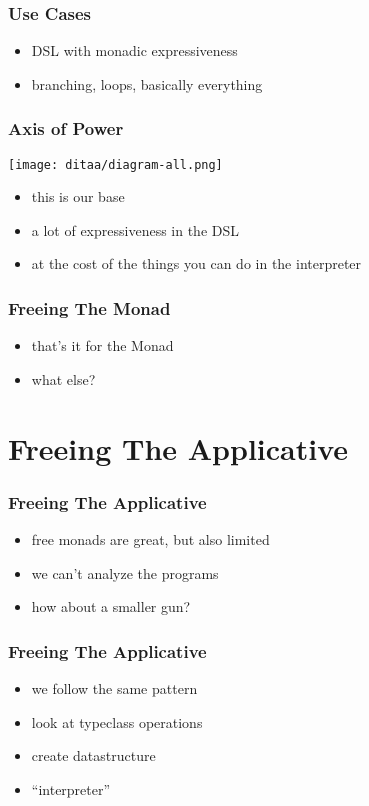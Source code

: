 \documentclass{beamer}
\begin{document}
\begin{frame}
  \frametitle{Use Cases}
  \begin{itemize}
  \item DSL with monadic expressiveness
  \item branching, loops, basically everything
  \end{itemize}
\end{frame}

\begin{frame}
  \frametitle{Axis of Power}
  \texttt{[image: ditaa/diagram-all.png]}
  \begin{itemize}
  \item this is our base
  \item a lot of expressiveness in the DSL
  \item at the cost of the things you can do in the interpreter
  \end{itemize}
\end{frame}

\begin{frame}
  \frametitle{Freeing The Monad}
  \begin{itemize}
  \item that's it for the Monad
  \item what else?
  \end{itemize}
\end{frame}

\section{Freeing The Applicative}\label{sec:free-applicative}

\begin{frame}
  \frametitle{Freeing The Applicative}
  \begin{itemize}
  \item free monads are great, but also limited
  \item we can't analyze the programs
  \item how about a smaller gun?
  \end{itemize}
\end{frame}

\begin{frame}
  \frametitle{Freeing The Applicative}
  \begin{itemize}
  \item we follow the same pattern
  \item look at typeclass operations
  \item create datastructure
  \item ``interpreter''
  \end{itemize}
\end{frame}
\end{document}
